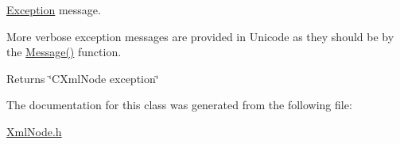 \mbox{\hyperlink{classxmlnode_1_1_c_xml_node_1_1_exception}{Exception}} message. 

More verbose exception messages are provided in Unicode as they should be by the \mbox{\hyperlink{classxmlnode_1_1_c_xml_node_1_1_exception_a29271ad0ec50958663200f60aaae97b2}{Message()}} function. \begin{DoxyReturn}{Returns}
\char`\"{}\+C\+Xml\+Node exception\char`\"{} 
\end{DoxyReturn}


The documentation for this class was generated from the following file\+:\begin{DoxyCompactItemize}
\item 
\mbox{\hyperlink{_xml_node_8h}{Xml\+Node.\+h}}\end{DoxyCompactItemize}
